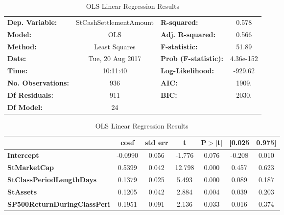 \begin{table}[H]
\footnotesize
\begin{center}
\caption{OLS Linear Regression Results}
\label{ols}
\begin{tabular}{lclc}
\toprule
\textbf{Dep. Variable:}                & StCashSettlementAmount & \textbf{  R-squared:         } &     0.578   \\
\textbf{Model:}                        &          OLS           & \textbf{  Adj. R-squared:    } &     0.566   \\
\textbf{Method:}                       &     Least Squares      & \textbf{  F-statistic:       } &     51.89   \\
\textbf{Date:}                         &    Tue, 20 Aug 2017    & \textbf{  Prob (F-statistic):} & 4.36e-152   \\
\textbf{Time:}                         &        10:11:40        & \textbf{  Log-Likelihood:    } &   -929.62   \\
\textbf{No. Observations:}             &            936         & \textbf{  AIC:               } &     1909.   \\
\textbf{Df Residuals:}                 &            911         & \textbf{  BIC:               } &     2030.   \\
\textbf{Df Model:}                     &             24         & \textbf{                     } &             \\
\bottomrule
\end{tabular}
\begin{tabular}{lcccccc}
                                       & \textbf{coef} & \textbf{std err} & \textbf{t} & \textbf{P$>$$|$t$|$} & \textbf{[0.025} & \textbf{0.975]}  \\
\midrule
\textbf{Intercept}                     &      -0.0990  &        0.056     &    -1.776  &         0.076        &       -0.208    &        0.010     \\
\textbf{StMarketCap}                   &       0.5399  &        0.042     &    12.798  &         0.000        &        0.457    &        0.623     \\
\textbf{StClassPeriodLengthDays}       &       0.1379  &        0.025     &     5.493  &         0.000        &        0.089    &        0.187     \\
\textbf{StAssets}                      &       0.1205  &        0.042     &     2.884  &         0.004        &        0.039    &        0.203     \\
\textbf{SP500ReturnDuringClassPeri}    &       0.1951  &        0.091     &     2.136  &         0.033        &        0.016    &        0.374     \\

\end{tabular}
\end{center}
\end{table}
